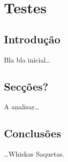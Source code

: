 \chapter{Testes}
\label{ch::testes}

\section{Introdução}
\label{sec::testes:intro}

Bla bla inicial\ldots


\section{Secções?}
A analisar\ldots


\section{Conclusões}
\label{sec::testes:conc}

\ldots Whiskas Saquetas.
